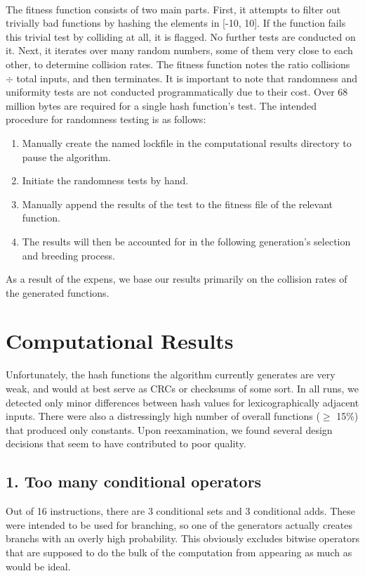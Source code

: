 \documentclass{article}
\begin{document}
\paragraph{}
The fitness function consists of two main parts. First, it attempts to filter out trivially bad functions by hashing the elements in [-10, 10]. If the function fails this trivial test by colliding at all, it is flagged. No further tests are conducted on it.
Next, it iterates over many random numbers, some of them very close to each other, to determine collision rates.
The fitness function notes the ratio collisions $\div$ total inputs, and then terminates.
It is important to note that randomness and uniformity tests are not conducted programmatically due to their cost. Over 68 million bytes are required for a single hash function's test. The intended procedure for randomness testing is as follows: 
\begin{enumerate}
	\item Manually create the named lockfile in the computational results directory to pause the algorithm.
	\item Initiate the randomness tests by hand.
	\item Manually append the results of the test to the fitness file of the relevant function. 
	\item The results will then be accounted for in the following generation's selection and breeding process.
\end{enumerate}

As a result of the expens, we base our results primarily on the collision rates of the generated functions.

\section{Computational Results}
Unfortunately, the hash functions the algorithm currently generates are very weak, and would at best serve as CRCs or checksums of some sort. In all runs, we detected only minor differences between hash values for lexicographically adjacent inputs.
There were also a distressingly high number of overall functions ($\geq$ 15\%) that produced only constants. Upon reexamination, we found several design decisions that seem to have contributed to poor quality.

\subsection{1. Too many conditional operators}
Out of 16 instructions, there are 3 conditional sets and 3 conditional adds. These were intended to be used for branching, so one of the generators actually creates branchs with an overly high probability. This obviously excludes bitwise operators that are supposed to do the bulk of the computation from appearing as much as would be ideal.
\end{document}
